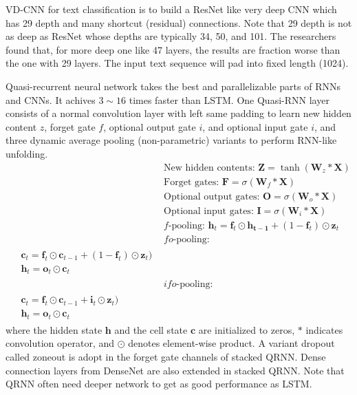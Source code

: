 VD-CNN  for text classification is to build a ResNet like very deep CNN which has 29 depth and many shortcut (residual) connections.
Note that 29 depth is not as deep as ResNet whose depths are typically 34, 50, and 101.
The researchers found that, for more deep one like 47 layers, the results are fraction worse than the one with 29 layers.
The input text sequence will pad into fixed length (1024).

Quasi-recurrent neural network takes the best and parallelizable parts of RNNs and CNNs.
It achives $3\sim16$ times faster than LSTM.
One Quasi-RNN layer consists of a normal convolution layer with left same padding to learn new hidden content $z$, forget gate $f$, optional output gate $i$, and optional input gate $i$, and three dynamic average pooling (non-parametric) variants to perform RNN-like unfolding.
\begin{align}
&\text{New hidden contents: } \bm{Z} = \tanh(\bm{W}_z * \bm{X}) \nonumber \\
&\text{Forget gates: } \bm{F} = \sigma(\bm{W}_f * \bm{X}) \nonumber \\
&\text{Optional output gates: } \bm{O} = \sigma(\bm{W}_o * \bm{X}) \nonumber \\
&\text{Optional input gates: } \bm{I} = \sigma(\bm{W}_i * \bm{X}) \nonumber \\
&\textit{f}\text{-pooling: } \bm{h}_t = \bm{f}_t \odot \bm{h_{t-1}} + (1 - \bm{f}_t) \odot \bm{z}_t \nonumber \\
&\textit{fo}\text{-pooling: } \nonumber \\
\begin{split}
&\bm{c}_t = \bm{f}_t \odot \bm{c}_{t-1} + (1-\bm{f}_t) \odot \bm{z}_t) \nonumber \\
&\bm{h}_t = \bm{o}_t \odot \bm{c}_t \nonumber
\end{split} \nonumber \\
&\textit{ifo}\text{-pooling: } \nonumber \\
\begin{split}
&\bm{c}_t = \bm{f}_t \odot \bm{c}_{t-1} + \bm{i}_t \odot \bm{z}_t) \nonumber \\
&\bm{h}_t = \bm{o}_t \odot \bm{c}_t \nonumber
\end{split} \nonumber
\end{align}
where the hidden state $\bm{h}$ and the cell state $\bm{c}$ are initialized to zeros, $*$ indicates convolution operator, and $\odot$ denotes element-wise product.
A variant dropout called zoneout is adopt in the forget gate channels of stacked QRNN.
Dense connection layers from DenseNet are also extended in stacked QRNN.
Note that QRNN often need deeper network to get as good performance as LSTM.

